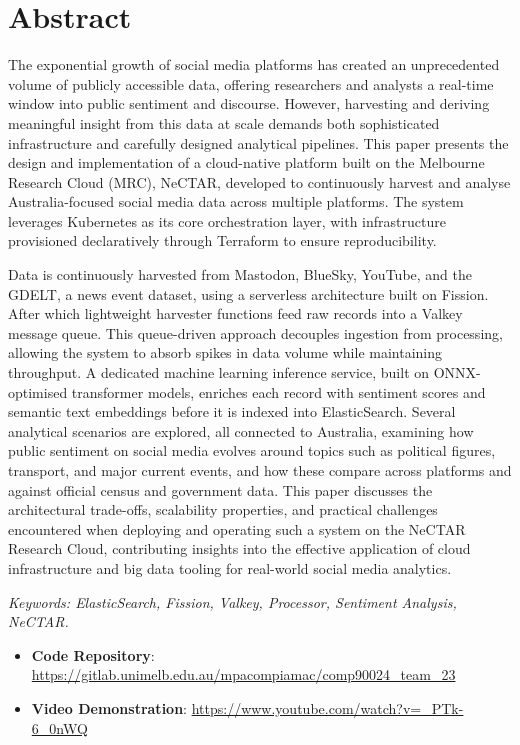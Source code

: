 \section*{Abstract}

The exponential growth of social media platforms has created an unprecedented volume of publicly accessible data, offering researchers and analysts a real-time window into public sentiment and discourse. However, harvesting and deriving meaningful insight from this data at scale demands both sophisticated infrastructure and carefully designed analytical pipelines. This paper presents the design and implementation of a cloud-native platform built on the Melbourne Research Cloud (MRC), NeCTAR, developed to continuously harvest and analyse Australia-focused social media data across multiple platforms. The system leverages Kubernetes as its core orchestration layer, with infrastructure provisioned declaratively through Terraform to ensure reproducibility. 


Data is continuously harvested from Mastodon, BlueSky, YouTube, and the GDELT, a news event dataset, using a serverless architecture built on Fission. After which lightweight harvester functions feed raw records into a Valkey message queue. This queue-driven approach decouples ingestion from processing, allowing the system to absorb spikes in data volume while maintaining throughput. A dedicated machine learning inference service, built on ONNX-optimised transformer models, enriches each record with sentiment scores and semantic text embeddings before it is indexed into ElasticSearch. Several analytical scenarios are explored, all connected to Australia, examining how public sentiment on social media evolves around topics such as political figures, transport, and major current events, and how these compare across platforms and against official census and government data. This paper discusses the architectural trade-offs, scalability properties, and practical challenges encountered when deploying and operating such a system on the NeCTAR Research Cloud, contributing insights into the effective application of cloud infrastructure and big data tooling for real-world social media analytics.

\textit{
Keywords: ElasticSearch, Fission, Valkey, Processor, Sentiment Analysis, NeCTAR.
}

\begin{itemize}
	\item \textbf{Code Repository}: \url{https://gitlab.unimelb.edu.au/mpacompiamac/comp90024_team_23}
	
	\item \textbf{Video Demonstration}: \url{https://www.youtube.com/watch?v=_PTk-6_0nWQ}
\end{itemize}